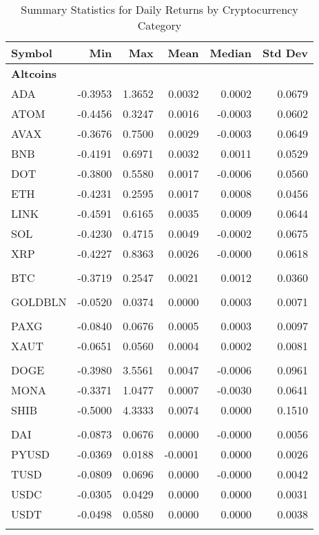 \begin{table}[ht]
\centering
\scriptsize
\setlength{\tabcolsep}{4pt}
\begin{tabular}{lrrrrr}
\toprule
Symbol & Min & Max & Mean & Median & Std Dev \\
\midrule
\multicolumn{6}{l}{\textbf{Altcoins}} \\
ADA & -0.3953 & 1.3652 & 0.0032 & 0.0002 & 0.0679 \\
ATOM & -0.4456 & 0.3247 & 0.0016 & -0.0003 & 0.0602 \\
AVAX & -0.3676 & 0.7500 & 0.0029 & -0.0003 & 0.0649 \\
BNB & -0.4191 & 0.6971 & 0.0032 & 0.0011 & 0.0529 \\
DOT & -0.3800 & 0.5580 & 0.0017 & -0.0006 & 0.0560 \\
ETH & -0.4231 & 0.2595 & 0.0017 & 0.0008 & 0.0456 \\
LINK & -0.4591 & 0.6165 & 0.0035 & 0.0009 & 0.0644 \\
SOL & -0.4230 & 0.4715 & 0.0049 & -0.0002 & 0.0675 \\
XRP & -0.4227 & 0.8363 & 0.0026 & -0.0000 & 0.0618 \\
\addlinespace
\multicolumn{6}{l}{\textbf{Bitcoin}} \\
BTC & -0.3719 & 0.2547 & 0.0021 & 0.0012 & 0.0360 \\
\addlinespace
\multicolumn{6}{l}{\textbf{Gold}} \\
GOLDBLN & -0.0520 & 0.0374 & 0.0000 & 0.0003 & 0.0071 \\
\addlinespace
\multicolumn{6}{l}{\textbf{Gold Pegged}} \\
PAXG & -0.0840 & 0.0676 & 0.0005 & 0.0003 & 0.0097 \\
XAUT & -0.0651 & 0.0560 & 0.0004 & 0.0002 & 0.0081 \\
\addlinespace
\multicolumn{6}{l}{\textbf{Meme Coins}} \\
DOGE & -0.3980 & 3.5561 & 0.0047 & -0.0006 & 0.0961 \\
MONA & -0.3371 & 1.0477 & 0.0007 & -0.0030 & 0.0641 \\
SHIB & -0.5000 & 4.3333 & 0.0074 & 0.0000 & 0.1510 \\
\addlinespace
\multicolumn{6}{l}{\textbf{Stablecoins}} \\
DAI & -0.0873 & 0.0676 & 0.0000 & -0.0000 & 0.0056 \\
PYUSD & -0.0369 & 0.0188 & -0.0001 & 0.0000 & 0.0026 \\
TUSD & -0.0809 & 0.0696 & 0.0000 & -0.0000 & 0.0042 \\
USDC & -0.0305 & 0.0429 & 0.0000 & 0.0000 & 0.0031 \\
USDT & -0.0498 & 0.0580 & 0.0000 & 0.0000 & 0.0038 \\
\addlinespace
\bottomrule
\end{tabular}
\caption{Summary Statistics for Daily Returns by Cryptocurrency Category}
\label{tab:crypto_return_summary}
\end{table}
